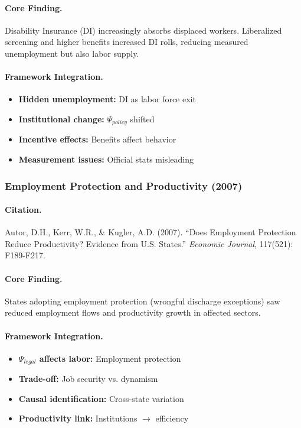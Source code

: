 \paragraph{Core Finding.}
Disability Insurance (DI) increasingly absorbs displaced workers.
Liberalized screening and higher benefits increased DI rolls,
reducing measured unemployment but also labor supply.

\paragraph{Framework Integration.}
\begin{itemize}
  \item \textbf{Hidden unemployment:} DI as labor force exit
  \item \textbf{Institutional change:} $\Psi_{policy}$ shifted
  \item \textbf{Incentive effects:} Benefits affect behavior
  \item \textbf{Measurement issues:} Official stats misleading
\end{itemize}

\subsubsection{Employment Protection and Productivity (2007)}

\paragraph{Citation.}
Autor, D.H., Kerr, W.R., \& Kugler, A.D. (2007). ``Does Employment
Protection Reduce Productivity? Evidence from U.S. States.''
\emph{Economic Journal}, 117(521): F189-F217.

\paragraph{Core Finding.}
States adopting employment protection (wrongful discharge exceptions)
saw reduced employment flows and productivity growth in affected sectors.

\paragraph{Framework Integration.}
\begin{itemize}
  \item \textbf{$\Psi_{legal}$ affects labor:} Employment protection
  \item \textbf{Trade-off:} Job security vs. dynamism
  \item \textbf{Causal identification:} Cross-state variation
  \item \textbf{Productivity link:} Institutions $\to$ efficiency
\end{itemize}


